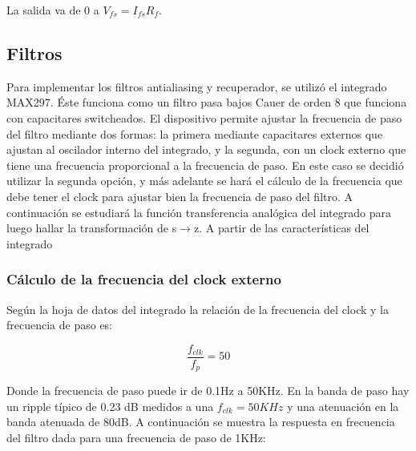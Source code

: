 \documentclass[assd_tp3_main.tex]{subfiles}
\begin{document}
La salida va de 0 a $V_{fs} = I_{fs}R_f$. 

\subsection{Filtros}
Para implementar los filtros antialiasing y recuperador, se utilizó el integrado MAX297.
Éste funciona como un filtro pasa bajos Cauer de orden 8 que funciona con capacitares switcheados. El dispositivo permite ajustar la frecuencia de paso del filtro
mediante dos formas: la primera mediante capacitares externos que ajustan al
oscilador interno del integrado, y la segunda, con un clock externo que tiene una
frecuencia proporcional a la frecuencia de paso.
En este caso se decidió utilizar la segunda opción, y más adelante se hará el cálculo
de la frecuencia que debe tener el clock para ajustar bien la frecuencia de paso del
filtro.
A continuación se estudiará la función transferencia analógica del integrado para
luego hallar la transformación de s$\rightarrow$z. A partir de las características del integrado

\subsubsection{Cálculo de la frecuencia del clock externo}

Según la hoja de datos del integrado la relación de la frecuencia del clock y la frecuencia de paso es: 

\begin{equation}
	\frac{f_{clk}}{f_p} = 50
	\label{eq:fpfclk}
\end{equation} 

Donde la frecuencia de paso puede ir de 0.1Hz a 50KHz. En la banda de paso hay un
ripple típico de 0.23 dB medidos a una $f_{clk}=50KHz$ y una atenuación en la banda
atenuada de 80dB. A continuación se muestra la respuesta en frecuencia del filtro dada
para una frecuencia de paso de 1KHz: 
\end{document}
